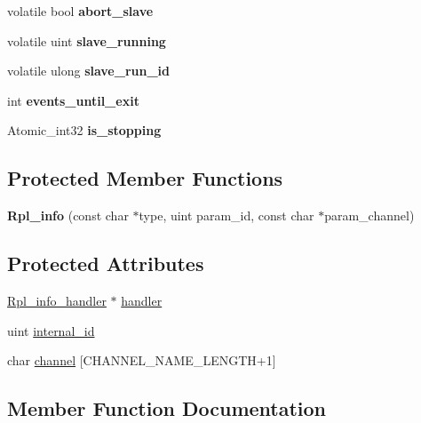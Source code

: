 \begin{DoxyCompactItemize}
volatile bool {\bfseries abort\+\_\+slave}
\item 
\mbox{\label{classRpl__info_af9ec7652a0f58d575b2927d3664a9e21}} 
volatile uint {\bfseries slave\+\_\+running}
\item 
\mbox{\label{classRpl__info_a12ec9046fb41f764596ea1e4c4a8466e}} 
volatile ulong {\bfseries slave\+\_\+run\+\_\+id}
\item 
\mbox{\label{classRpl__info_ae6619c0706a7bb5c39ad5c120587470b}} 
int {\bfseries events\+\_\+until\+\_\+exit}
\item 
\mbox{\label{classRpl__info_afee152ccea76f6d225ea46932dc70cb8}} 
Atomic\+\_\+int32 {\bfseries is\+\_\+stopping}
\end{DoxyCompactItemize}
\subsection*{Protected Member Functions}
\begin{DoxyCompactItemize}
\item 
\mbox{\label{classRpl__info_a80e37c06a77a388428bba6e05ab77d4c}} 
{\bfseries Rpl\+\_\+info} (const char $\ast$type, uint param\+\_\+id, const char $\ast$param\+\_\+channel)
\end{DoxyCompactItemize}
\subsection*{Protected Attributes}
\begin{DoxyCompactItemize}
\item 
\mbox{\hyperlink{classRpl__info__handler}{Rpl\+\_\+info\+\_\+handler}} $\ast$ \mbox{\hyperlink{classRpl__info_a0ce35fc9ef5b03d26b6cb34dd04b0583}{handler}}
\item 
uint \mbox{\hyperlink{classRpl__info_a409b8a0921617ffd71e40977be694eef}{internal\+\_\+id}}
\item 
char \mbox{\hyperlink{classRpl__info_add75a7f8b28db1173a07ae12960b2e7b}{channel}} \mbox{[}C\+H\+A\+N\+N\+E\+L\+\_\+\+N\+A\+M\+E\+\_\+\+L\+E\+N\+G\+TH+1\mbox{]}
\end{DoxyCompactItemize}


\subsection{Member Function Documentation}
\mbox{\label{classRpl__info_a1fd496522e010306eaab144e69a4056f}} 
